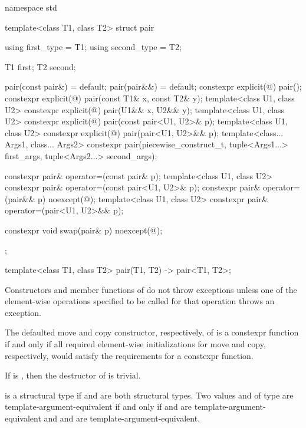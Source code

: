 %
\begin{codeblock}
namespace std {
  template<class T1, class T2>
  struct pair {
    using first_type  = T1;
    using second_type = T2;

    T1 first;
    T2 second;

    pair(const pair&) = default;
    pair(pair&&) = default;
    constexpr explicit(@\seebelow@) pair();
    constexpr explicit(@\seebelow@) pair(const T1& x, const T2& y);
    template<class U1, class U2>
      constexpr explicit(@\seebelow@) pair(U1&& x, U2&& y);
    template<class U1, class U2>
      constexpr explicit(@\seebelow@) pair(const pair<U1, U2>& p);
    template<class U1, class U2>
      constexpr explicit(@\seebelow@) pair(pair<U1, U2>&& p);
    template<class... Args1, class... Args2>
      constexpr pair(piecewise_construct_t,
                     tuple<Args1...> first_args, tuple<Args2...> second_args);

    constexpr pair& operator=(const pair& p);
    template<class U1, class U2>
      constexpr pair& operator=(const pair<U1, U2>& p);
    constexpr pair& operator=(pair&& p) noexcept(@\seebelow@);
    template<class U1, class U2>
      constexpr pair& operator=(pair<U1, U2>&& p);

    constexpr void swap(pair& p) noexcept(@\seebelow@);
  };

  template<class T1, class T2>
    pair(T1, T2) -> pair<T1, T2>;
}
\end{codeblock}

\pnum
Constructors and member functions of  do not throw exceptions unless one of
the element-wise operations specified to be called for that operation
throws an exception.

\pnum
The defaulted move and copy constructor, respectively, of 
is a constexpr function if and only if all required element-wise
initializations for move and copy, respectively, would satisfy the
requirements for a constexpr function.

\pnum
If 
is , then the destructor of  is trivial.

\pnum
{} is a structural type
if  and  are both structural types.
Two values  and  of type 
are template-argument-equivalent if and only if
 and  are template-argument-equivalent and
 and  are template-argument-equivalent.

